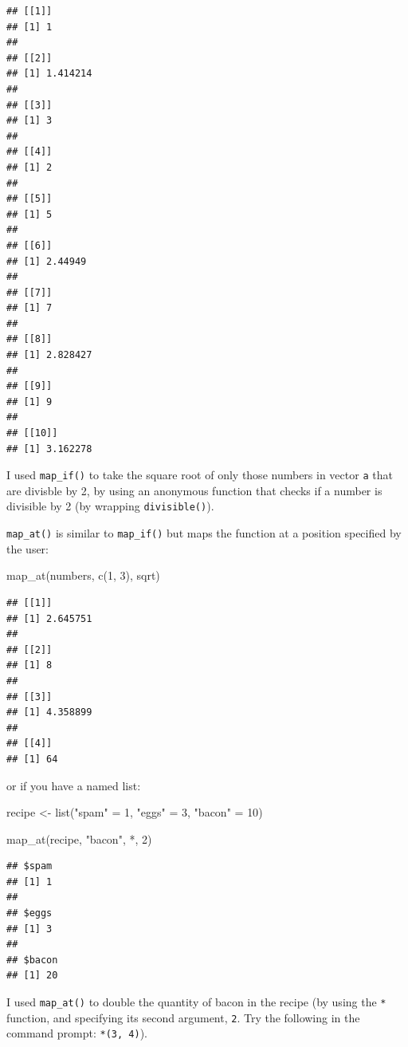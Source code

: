 \documentclass[
]{article}
\newenvironment{Shaded}{\begin{snugshade}}{\end{snugshade}}
\newcommand{\AttributeTok}[1]{\textcolor[rgb]{0.77,0.63,0.00}{#1}}
\newcommand{\DecValTok}[1]{\textcolor[rgb]{0.00,0.00,0.81}{#1}}
\newcommand{\FunctionTok}[1]{\textcolor[rgb]{0.00,0.00,0.00}{#1}}
\newcommand{\NormalTok}[1]{#1}
\newcommand{\OtherTok}[1]{\textcolor[rgb]{0.56,0.35,0.01}{#1}}
\newcommand{\StringTok}[1]{\textcolor[rgb]{0.31,0.60,0.02}{#1}}
\begin{document}
\begin{verbatim}
## [[1]]
## [1] 1
## 
## [[2]]
## [1] 1.414214
## 
## [[3]]
## [1] 3
## 
## [[4]]
## [1] 2
## 
## [[5]]
## [1] 5
## 
## [[6]]
## [1] 2.44949
## 
## [[7]]
## [1] 7
## 
## [[8]]
## [1] 2.828427
## 
## [[9]]
## [1] 9
## 
## [[10]]
## [1] 3.162278
\end{verbatim}

I used \texttt{map\_if()} to take the square root of only those numbers in vector \texttt{a} that are divisble by 2,
by using an anonymous function that checks if a number is divisible by 2 (by wrapping \texttt{divisible()}).

\texttt{map\_at()} is similar to \texttt{map\_if()} but maps the function at a position specified by the user:

\begin{Shaded}
\begin{Highlighting}[]
\FunctionTok{map\_at}\NormalTok{(numbers, }\FunctionTok{c}\NormalTok{(}\DecValTok{1}\NormalTok{, }\DecValTok{3}\NormalTok{), sqrt)}
\end{Highlighting}
\end{Shaded}

\begin{verbatim}
## [[1]]
## [1] 2.645751
## 
## [[2]]
## [1] 8
## 
## [[3]]
## [1] 4.358899
## 
## [[4]]
## [1] 64
\end{verbatim}

or if you have a named list:

\begin{Shaded}
\begin{Highlighting}[]
\NormalTok{recipe }\OtherTok{\textless{}{-}} \FunctionTok{list}\NormalTok{(}\StringTok{"spam"} \OtherTok{=} \DecValTok{1}\NormalTok{, }\StringTok{"eggs"} \OtherTok{=} \DecValTok{3}\NormalTok{, }\StringTok{"bacon"} \OtherTok{=} \DecValTok{10}\NormalTok{)}

\FunctionTok{map\_at}\NormalTok{(recipe, }\StringTok{"bacon"}\NormalTok{, }\StringTok{\textasciigrave{}}\AttributeTok{*}\StringTok{\textasciigrave{}}\NormalTok{, }\DecValTok{2}\NormalTok{)}
\end{Highlighting}
\end{Shaded}

\begin{verbatim}
## $spam
## [1] 1
## 
## $eggs
## [1] 3
## 
## $bacon
## [1] 20
\end{verbatim}

I used \texttt{map\_at()} to double the quantity of bacon in the recipe (by using the \texttt{*} function, and specifying
its second argument, \texttt{2}. Try the following in the command prompt: \texttt{\textasciigrave{}*\textasciigrave{}(3,\ 4)}).
\end{document}

